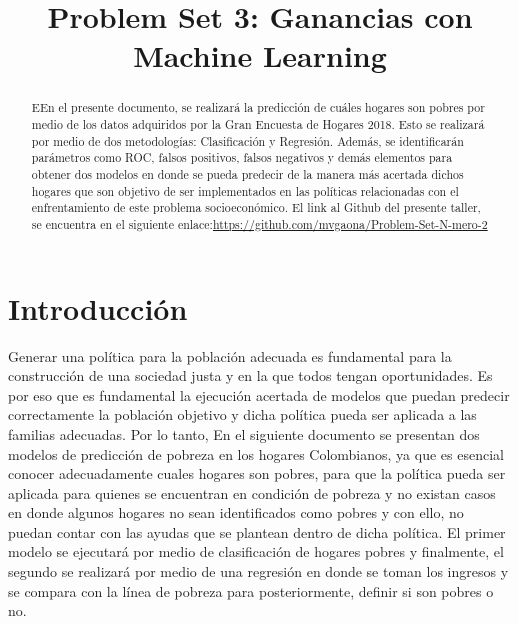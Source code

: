 \documentclass[conference, 10pt]{IEEEtran}
\begin{document}
\title{Problem Set 3: Ganancias con Machine Learning\\}

\author{
\and
{}
}

\maketitle

\begin{abstract}
EEn el presente documento, se realizará la predicción de cuáles hogares son pobres por medio de los datos adquiridos por la Gran Encuesta de Hogares 2018. Esto se realizará por medio de dos metodologías: Clasificación y Regresión. Además, se identificarán parámetros como ROC, falsos positivos, falsos negativos  y demás elementos para obtener dos modelos en donde se pueda predecir de la manera más acertada dichos hogares que son objetivo de ser implementados en las políticas relacionadas con el enfrentamiento de este problema socioeconómico. El link al Github del presente taller, se encuentra en el siguiente enlace:\url{https://github.com/mvgaona/Problem-Set-N-mero-2}\\

\end{abstract}


\section{Introducción}
Generar una política para la población adecuada es fundamental para la construcción de una sociedad justa y en la que todos tengan oportunidades. Es por eso que es fundamental la ejecución acertada de modelos que puedan predecir correctamente la población objetivo y dicha política pueda ser aplicada a las familias adecuadas. Por lo tanto, En el siguiente documento se presentan dos modelos de predicción de pobreza en los hogares Colombianos, ya que es esencial conocer adecuadamente cuales hogares son pobres, para que la política pueda ser aplicada para quienes se encuentran en condición de pobreza y no existan casos en donde algunos hogares no sean identificados como pobres y con ello, no puedan contar con las ayudas que se plantean dentro de dicha política. El primer modelo se ejecutará por medio de clasificación de hogares pobres y finalmente, el segundo se realizará por  medio de una regresión en donde se toman los ingresos y se compara con la línea de pobreza para posteriormente, definir si son pobres o no. 
\end{document}
